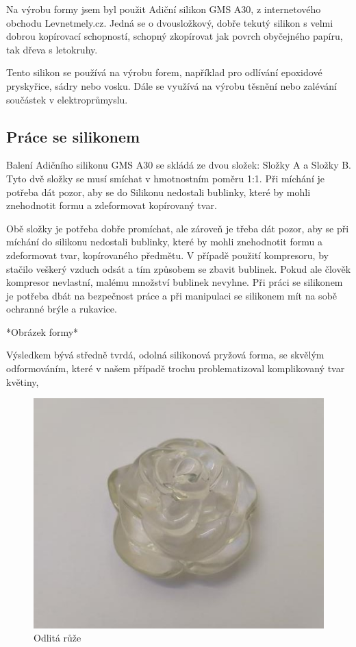 Na výrobu formy jsem byl použit Adiční silikon GMS A30, z internetového obchodu Levnetmely.cz. Jedná se o dvousložkový, dobře tekutý silikon s velmi dobrou kopírovací schopností, schopný zkopírovat jak povrch obyčejného papíru, tak dřeva s letokruhy.

Tento silikon se používá na výrobu forem, například pro odlívání epoxidové pryskyřice, sádry nebo vosku. Dále se využívá na výrobu těsnění nebo zalévání součástek v elektroprůmyslu.


\subsection{Práce se silikonem}
Balení Adičního silikonu GMS A30 se skládá ze dvou složek: Složky A a Složky B. Tyto dvě složky se musí smíchat v hmotnostním poměru 1:1. Při míchání je potřeba dát pozor, aby se do Silikonu nedostali bublinky, které by mohli znehodnotit formu a zdeformovat kopírovaný tvar.

Obě složky je potřeba dobře promíchat, ale zároveň je třeba dát pozor, aby se při míchání do silikonu nedostali bublinky, které by mohli znehodnotit formu a zdeformovat tvar, kopírovaného předmětu. V případě použití kompresoru, by stačilo veškerý vzduch odsát a tím způsobem se zbavit bublinek. Pokud ale člověk kompresor nevlastní, malému množství bublinek nevyhne. Při práci se silikonem je potřeba dbát na bezpečnost práce a při manipulaci se silikonem mít na sobě ochranné brýle a rukavice.

*Obrázek formy*

Výsledkem bývá středně tvrdá, odolná silikonová pryžová forma, se skvělým odformováním, které v našem případě trochu problematizoval komplikovaný tvar květiny, 


\begin{figure}[htbp]
	\centering
	\includegraphics[width=0.5
	\textwidth]{img/05 odl/Rose.jpg}
	\caption{Odlitá růže}
\end{figure}

